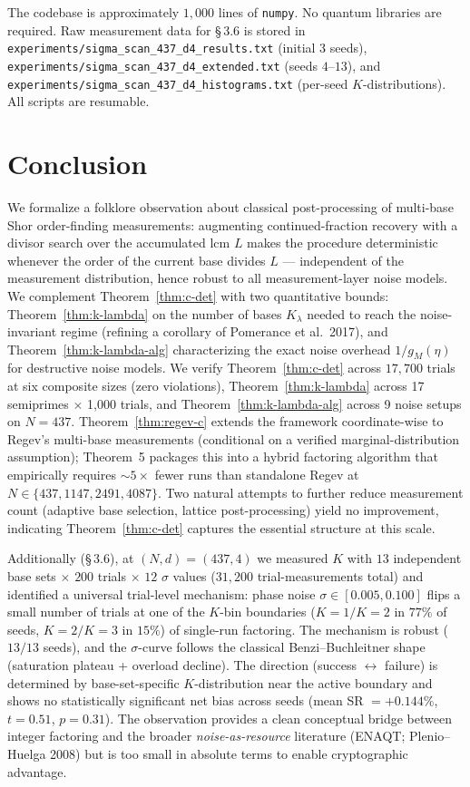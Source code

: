 \documentclass[11pt]{article}
\begin{document}
\noindent
The codebase is approximately $1{,}000$ lines of \texttt{numpy}. No quantum libraries are required. Raw measurement data for \S\,3.6 is stored in \texttt{experiments/sigma\_scan\_437\_d4\_results.txt} (initial $3$ seeds), \texttt{experiments/sigma\_scan\_437\_d4\_extended.txt} (seeds $4$--$13$), and \texttt{experiments/sigma\_scan\_437\_d4\_histograms.txt} (per-seed $K$-distributions). All scripts are resumable.

\section{Conclusion}
\label{sec:conclusion}

We formalize a folklore observation about classical post-processing of multi-base Shor order-finding measurements: augmenting continued-fraction recovery with a divisor search over the accumulated lcm $L$ makes the procedure deterministic whenever the order of the current base divides $L$ --- independent of the measurement distribution, hence robust to all measurement-layer noise models. We complement Theorem~\ref{thm:c-det} with two quantitative bounds: Theorem~\ref{thm:k-lambda} on the number of bases $K_\lambda$ needed to reach the noise-invariant regime (refining a corollary of Pomerance et al.~2017), and Theorem~\ref{thm:k-lambda-alg} characterizing the exact noise overhead $1/g_M(\eta)$ for destructive noise models. We verify Theorem~\ref{thm:c-det} across $17{,}700$ trials at six composite sizes (zero violations), Theorem~\ref{thm:k-lambda} across 17 semiprimes $\times$ 1{,}000 trials, and Theorem~\ref{thm:k-lambda-alg} across 9 noise setups on $N = 437$. Theorem~\ref{thm:regev-c} extends the framework coordinate-wise to Regev's multi-base measurements (conditional on a verified marginal-distribution assumption); Theorem~5 packages this into a hybrid factoring algorithm that empirically requires $\sim 5\times$ fewer runs than standalone Regev at $N \in \{437, 1147, 2491, 4087\}$. Two natural attempts to further reduce measurement count (adaptive base selection, lattice post-processing) yield no improvement, indicating Theorem~\ref{thm:c-det} captures the essential structure at this scale.

Additionally (\S\,3.6), at $(N, d) = (437, 4)$ we measured $K$ with $13$ independent base sets $\times$ $200$ trials $\times$ $12$ $\sigma$ values ($31{,}200$ trial-measurements total) and identified a universal trial-level mechanism: phase noise $\sigma \in [0.005, 0.100]$ flips a small number of trials at one of the $K$-bin boundaries ($K{=}1/K{=}2$ in $77\%$ of seeds, $K{=}2/K{=}3$ in $15\%$) of single-run factoring. The mechanism is robust ($13/13$ seeds), and the $\sigma$-curve follows the classical Benzi--Buchleitner shape (saturation plateau + overload decline). The direction (success $\leftrightarrow$ failure) is determined by base-set-specific $K$-distribution near the active boundary and shows no statistically significant net bias across seeds (mean SR $= +0.144\%$, $t = 0.51$, $p = 0.31$). The observation provides a clean conceptual bridge between integer factoring and the broader \emph{noise-as-resource} literature (ENAQT; Plenio--Huelga 2008) but is too small in absolute terms to enable cryptographic advantage.
\end{document}
